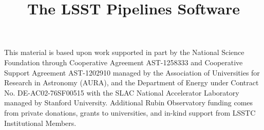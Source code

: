 \documentclass[twocolumn]{aastex631}
\begin{document}
\title{The LSST Pipelines Software}





















\begin{acknowledgments}
This material is based upon work supported in part by the National Science Foundation through Cooperative Agreement AST-1258333 and Cooperative Support Agreement AST-1202910 managed by the Association of Universities for Research in Astronomy (AURA), and the Department of Energy under Contract No. DE-AC02-76SF00515 with the SLAC National Accelerator Laboratory managed by Stanford University.
Additional Rubin Observatory funding comes from private donations, grants to universities, and in-kind support from LSSTC Institutional Members.
\end{acknowledgments}



\end{document}
